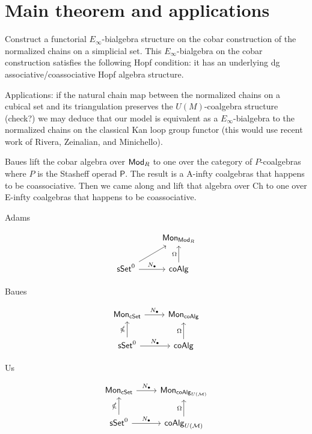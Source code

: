 \section{Main theorem and applications}

Construct a functorial $E_{\infty}$-bialgebra structure on the cobar construction of the normalized chains on a simplicial set. This $E_{\infty}$-bialgebra on the cobar construction satisfies the following Hopf condition: it has an underlying dg associative/coassociative Hopf algebra structure. 

Applications: if the natural chain map between the normalized chains on a cubical set and its triangulation preserves the $U(M)$-coalgebra structure (check?) we may deduce that our model is equivalent as a $E_{\infty}$-bialgebra to the normalized chains on the classical Kan loop group functor (this would use recent work of Rivera, Zeinalian, and Minichello).


Baues lift the cobar algebra over $\mathsf{Mod}_R$ to one over the category of $P$-coalgebras where $P$ is the Stasheff operad $\mathsf P$. The result is a A-infty coalgebras that happens to be coassociative. Then we came along and lift that algebra over Ch to one over E-infty coalgebras that happens to be coassociative.


Adams

\begin{equation*}
\begin{tikzcd}
& \Mon_{\Ch} \\
\sSet^0 \arrow[ru] \arrow[r, "\chains"] & \coAlg \arrow[u, "\cobar"]
\end{tikzcd}
\end{equation*}

Baues 

\begin{equation*}
\begin{tikzcd}
\Mon_{\cSet} \arrow[r, "\chains"] & \Mon_{\coAlg} \\
\sSet^0 \arrow[r, "\chains"] \arrow[u, "\gcobar"] & \coAlg \arrow[u, "\cobar"]
\end{tikzcd}
\end{equation*}

Us

\begin{equation*}
\begin{tikzcd}
\Mon_{\cSet} \arrow[r, "\chains"] & \Mon_{\coAlg_{U(\M)}} \\
\sSet^0 \arrow[r, "\chains"] \arrow[u, "\gcobar"] & \coAlg_{U(\M)} \arrow[u, "\cobar"]
\end{tikzcd}
\end{equation*}